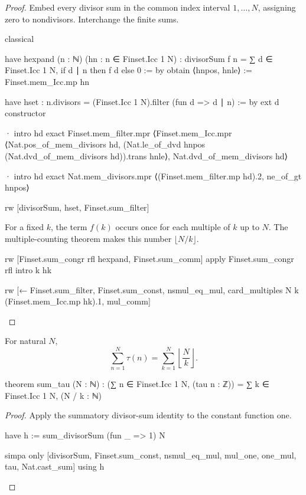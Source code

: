 \begin{proof}
  Embed every divisor sum in the common index interval $1,\ldots,N$, assigning zero to
  nondivisors.
  Interchange the finite sums.

  \begin{lean}
    classical

    have hexpand (n : ℕ) (hn : n ∈ Finset.Icc 1 N) :
        divisorSum f n = ∑ d ∈ Finset.Icc 1 N, if d ∣ n then f d else 0 := by
      obtain ⟨hnpos, hnle⟩ := Finset.mem_Icc.mp hn

      have hset : n.divisors = (Finset.Icc 1 N).filter (fun d => d ∣ n) := by
        ext d
        constructor

        · intro hd
          exact Finset.mem_filter.mpr
            ⟨Finset.mem_Icc.mpr ⟨Nat.pos_of_mem_divisors hd,
              (Nat.le_of_dvd hnpos (Nat.dvd_of_mem_divisors hd)).trans hnle⟩,
              Nat.dvd_of_mem_divisors hd⟩

        · intro hd
          exact Nat.mem_divisors.mpr ⟨(Finset.mem_filter.mp hd).2, ne_of_gt hnpos⟩

      rw [divisorSum, hset, Finset.sum_filter]
  \end{lean}

  For a fixed $k$, the term $f(k)$ occurs once for each multiple of $k$ up to $N$.
  The multiple-counting theorem makes this number $\lfloor N/k\rfloor$.

  \begin{lean}
    rw [Finset.sum_congr rfl hexpand, Finset.sum_comm]
    apply Finset.sum_congr rfl
    intro k hk

    rw [← Finset.sum_filter, Finset.sum_const, nsmul_eq_mul,
      card_multiples N k (Finset.mem_Icc.mp hk).1, mul_comm]
  \end{lean}
\end{proof}

\begin{theorem}
  \label{ent:thm:sum-tau}
  For natural $N$, \[ \sum_{n=1}^N\tau(n)=\sum_{k=1}^N\left\lfloor\frac Nk\right\rfloor. \]

  \begin{lean}
    theorem sum_tau (N : ℕ) :
        (∑ n ∈ Finset.Icc 1 N, (tau n : ℤ)) = ∑ k ∈ Finset.Icc 1 N, (N / k : ℕ)
  \end{lean}
\end{theorem}

\begin{proof}
  Apply the summatory divisor-sum identity to the constant function one.

  \begin{lean}
    have h := sum_divisorSum (fun _ => 1) N

    simpa only [divisorSum, Finset.sum_const, nsmul_eq_mul, mul_one, one_mul, tau, Nat.cast_sum] using h
  \end{lean}
\end{proof}

